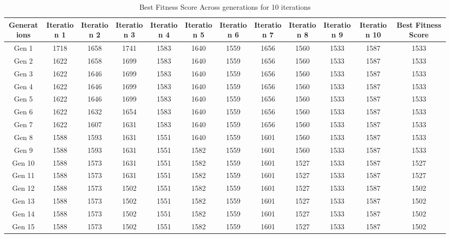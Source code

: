 \documentclass[12pt]{article}
\begin{document}
\begin{table}[h]
    \centering
    \caption{Best Fitness Score Across generations for 10 iterations}
    \label{tab:fitness_scores}
    \begin{adjustbox}{max width=0.5\textwidth} %
        \begin{tabular}{*{12}{c}}
        \toprule
        Generations & Iteration 1 & Iteration 2 & Iteration 3 & Iteration 4 & Iteration 5 & Iteration 6 & Iteration 7 & Iteration 8 & Iteration 9 & Iteration 10 & Best Fitness Score \\
        \midrule
        Gen 1 & 1718 & 1658 & 1741 & 1583 & 1640 & 1559 & 1656 & 1560 & 1533 & 1587 & 1533 \\
        Gen 2 & 1622 & 1658 & 1699 & 1583 & 1640 & 1559 & 1656 & 1560 & 1533 & 1587 & 1533 \\
        Gen 3 & 1622 & 1646 & 1699 & 1583 & 1640 & 1559 & 1656 & 1560 & 1533 & 1587 & 1533 \\
        Gen 4 & 1622 & 1646 & 1699 & 1583 & 1640 & 1559 & 1656 & 1560 & 1533 & 1587 & 1533 \\
        Gen 5 & 1622 & 1646 & 1699 & 1583 & 1640 & 1559 & 1656 & 1560 & 1533 & 1587 & 1533 \\
        Gen 6 & 1622 & 1632 & 1654 & 1583 & 1640 & 1559 & 1656 & 1560 & 1533 & 1587 & 1533 \\
        Gen 7 & 1622 & 1607 & 1631 & 1583 & 1640 & 1559 & 1656 & 1560 & 1533 & 1587 & 1533 \\
        Gen 8 & 1588 & 1593 & 1631 & 1551 & 1640 & 1559 & 1601 & 1560 & 1533 & 1587 & 1533 \\
        Gen 9 & 1588 & 1593 & 1631 & 1551 & 1582 & 1559 & 1601 & 1560 & 1533 & 1587 & 1533 \\
        Gen 10 & 1588 & 1573 & 1631 & 1551 & 1582 & 1559 & 1601 & 1527 & 1533 & 1587 & 1527 \\
        Gen 11 & 1588 & 1573 & 1631 & 1551 & 1582 & 1559 & 1601 & 1527 & 1533 & 1587 & 1527 \\
        Gen 12 & 1588 & 1573 & 1502 & 1551 & 1582 & 1559 & 1601 & 1527 & 1533 & 1587 & 1502 \\
        Gen 13 & 1588 & 1573 & 1502 & 1551 & 1582 & 1559 & 1601 & 1527 & 1533 & 1587 & 1502 \\
        Gen 14 & 1588 & 1573 & 1502 & 1551 & 1582 & 1559 & 1601 & 1527 & 1533 & 1587 & 1502 \\
        Gen 15 & 1588 & 1573 & 1502 & 1551 & 1582 & 1559 & 1601 & 1527 & 1533 & 1587 & 1502 \\

\end{tabular}
\end{adjustbox}
\end{table}
\end{document}
